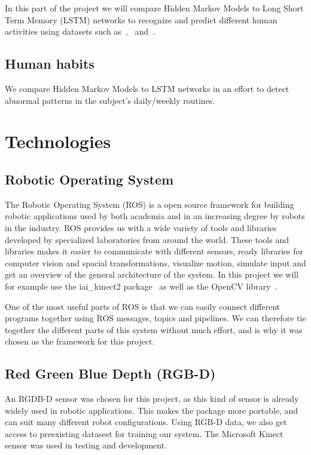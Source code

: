 In this part of the project we will compare Hidden Markov Models to Long Short Term Memory (LSTM) networks to recognize and predict different human activities using datasets such as~\cite{sung_rgbdactivity_2012},~\cite{h36m_pami} and~\cite{berkeley_mhad}.

\subsection{Human habits}
We compare Hidden Markov Models to LSTM networks in an effort to detect abnormal patterns in the subject's daily/weekly routines.

\section{Technologies}
\subsection{Robotic Operating System}
The Robotic Operating System (ROS) is a open source framework for building robotic applications used by both academia and in an increasing degree by robots in the industry. ROS provides us with a wide variety of tools and libraries developed by specialized laboratories from around the world. These tools and libraries makes it easier to communicate with different sensors, ready libraries for computer vision and spacial transformations, visualize motion, simulate input and get an overview of the general architecture of the system.
In this project we will for example use the iai\_kinect2 package~\cite{iai_kinect2} as well as the OpenCV library~\cite{opencv_library}.

One of the most useful parts of ROS is that we can easily connect different programs together using ROS messages, topics and pipelines. We can therefore tie together the different parts of this system without much effort, and is why it was chosen as the framework for this project.



\subsection{Red Green Blue Depth (RGB-D)}
An RGDB-D sensor was chosen for this project, as this kind of sensor is already widely used in robotic applications. This makes the package more portable, and can suit many different robot configurations. Using RGB-D data, we also get access to preexisting datasest for training our system. The Microsoft Kinect sensor was used in testing and development.

